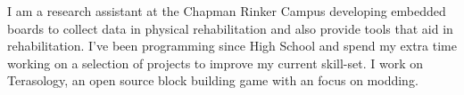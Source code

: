 

\begin{cvparagraph}

I am a research assistant at the Chapman Rinker Campus developing embedded boards to collect data in physical rehabilitation and also provide tools that aid in rehabilitation. I've been programming since High School and spend my extra time working on a selection of projects to improve my current skill-set. I work on Terasology, an open source block building game with an focus on modding. 
\end{cvparagraph}

